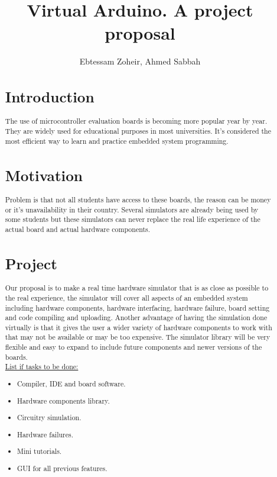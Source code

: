 \documentclass[a4paper]{article}
\author{Ebtessam Zoheir, Ahmed Sabbah}
\title{Virtual Arduino. A project proposal}
\begin{document}
\maketitle

\begin{abstract}
  
\section{Introduction}
\par The use of microcontroller evaluation boards is becoming more popular year by year. They are widely used for educational purposes in most universities. It’s considered the most efficient way to learn and practice embedded system programming.

\section{Motivation}
Problem is that not all students have access to these boards, the reason can be money or it’s unavailability in their country. Several simulators are already being used by some students but these simulators can never replace the real life experience of the actual board and actual hardware components.

\section{Project}
Our proposal is to make a real time hardware simulator that is as close as possible to the real experience, the simulator will cover all aspects of an embedded system including hardware components, hardware interfacing, hardware failure, board setting and code compiling and uploading. Another advantage of having the simulation done virtually is that it gives the user a wider variety of hardware components to work with that may not be available or may be too expensive. The simulator library will be very flexible and easy to expand to include future components and newer versions of the boards.\\

\noindent \underline{List if tasks to be done:}

\begin{itemize}
\item Compiler, IDE and board software.
\item Hardware components library.
\item Circuitry simulation.
\item Hardware failures.
\item Mini tutorials.
\item GUI for all previous features.
\end{itemize}
\end{abstract}
\end{document}
